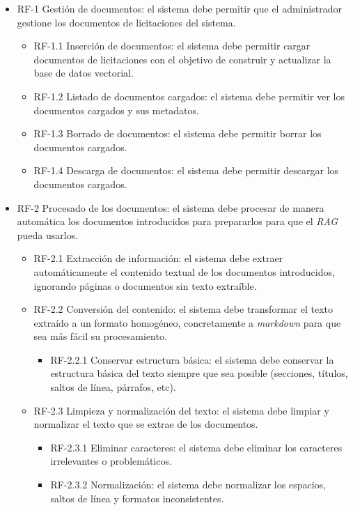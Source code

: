 \begin{itemize}
\tightlist
	\item RF-1 Gestión de documentos: el sistema debe permitir que el administrador gestione los documentos de licitaciones del sistema. 
	\begin{itemize}
	\tightlist
		\item RF-1.1 Inserción de documentos: el sistema debe permitir cargar documentos de licitaciones con el objetivo de construir y actualizar la base de datos vectorial.
		\item RF-1.2 Listado de documentos cargados: el sistema debe permitir ver los documentos cargados y sus metadatos.
		\item RF-1.3 Borrado de documentos: el sistema debe permitir borrar los documentos cargados.
		\item RF-1.4 Descarga de documentos: el sistema debe permitir descargar los documentos cargados.
	\end{itemize}
	\item RF-2 Procesado de los documentos: el sistema debe procesar de manera automática los documentos introducidos para prepararlos para que el \textit{RAG} pueda usarlos.
	\begin{itemize}
	\tightlist
		\item RF-2.1 Extracción de información: el sistema debe extraer automáticamente el contenido textual de los documentos introducidos, ignorando páginas o documentos sin texto extraíble.
		\item RF-2.2 Conversión del contenido: el sistema debe transformar el texto extraído a un formato homogéneo, concretamente a \textit{markdown} para que sea más fácil su procesamiento.
		\begin{itemize}
		\tightlist
			\item RF-2.2.1 Conservar estructura básica: el sistema debe conservar la estructura básica del texto siempre que sea posible (secciones, títulos, saltos de línea, párrafos, etc).
		\end{itemize}
		\item RF-2.3 Limpieza y normalización del texto: el sistema debe limpiar y normalizar el texto que se extrae de los documentos.
		\begin{itemize}
		\tightlist
			\item RF-2.3.1 Eliminar caracteres: el sistema debe eliminar los caracteres irrelevantes o problemáticos.
			\item RF-2.3.2 Normalización: el sistema debe normalizar los espacios, saltos de línea y formatos inconsistentes.

\end{itemize}
\end{itemize}
\end{itemize}
